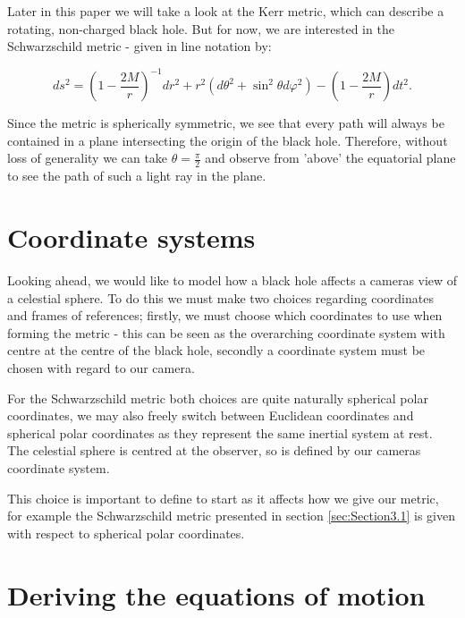 \documentclass[oneside,openright,frontopenright, singlespacing]{dmathesis}
\begin{document}
\vspace{1em}
Later in this paper we will take a look at the Kerr metric, which can describe a rotating, non-charged black hole. But for now, we are interested in the Schwarzschild metric - given in line notation by: 

	\[{ds^{2} = {\left(1-\frac {2M}{r}\right)}^{-1}} {dr^2} + {r^2}({d\theta ^2} + {\sin ^2}{\theta}{d\varphi ^2}) -{\left(1-\frac {2M}{r}\right)}{dt^2}.\]

\vspace{1em}
	Since the metric is spherically symmetric, we see that every path will always be contained in a plane intersecting the origin of the black hole. Therefore, without loss of generality we can take ${\theta}=\frac{\pi}{2}$ and observe from 'above’ the equatorial plane to see the path of such a light ray in the plane.

\section{Coordinate systems}\label{sec:Section3.2}

	Looking ahead, we would like to model how a black hole affects a cameras view of a celestial sphere. To do this we must make two choices regarding coordinates and frames of references; firstly, we must choose which coordinates to use when forming the metric - this can be seen as the overarching coordinate system with centre at the centre of the black hole, secondly a coordinate system must be chosen with regard to our camera.

\vspace{1em}
	For the Schwarzschild metric both choices are quite naturally spherical polar coordinates, we may also freely switch between Euclidean coordinates and spherical polar coordinates as they represent the same inertial system at rest. The celestial sphere is centred at the observer, so is defined by our cameras coordinate system.

\vspace{1em}
	This choice is important to define to start as it affects how we give our metric, for example the Schwarzschild metric presented in section \ref{sec:Section3.1} is given with respect to spherical polar coordinates.

\section{Deriving the equations of motion}\label{sec:Section3.3}
	
\end{document}
